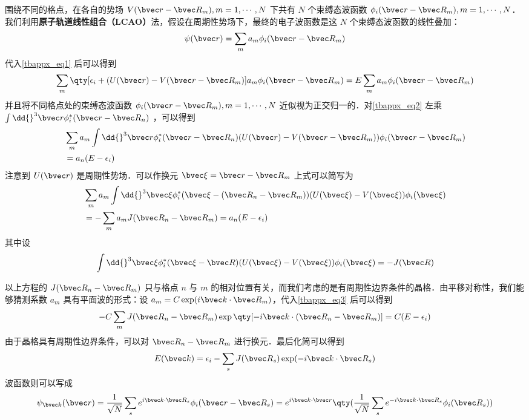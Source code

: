 围绕不同的格点，在各自的势场 $V(\bvec r-\bvec R_m),m=1,\cdots,N$ 下共有 $N$ 个束缚态波函数 $\phi_i(\bvec r-\bvec R_m),m=1,\cdots,N$．我们利用\textbf{原子轨道线性组合（LCAO）}法，假设在周期性势场下，最终的电子波函数是这 $N$ 个束缚态波函数的线性叠加：
\begin{equation}
\psi(\bvec r)=\sum_{m} a_m \phi_i(\bvec r-\bvec R_m)
\end{equation}
代入\autoref{tbappx_eq1} 后可以得到
\begin{equation}\label{tbappx_eq2}
\sum_{m}\qty[\epsilon_i+(U(\bvec r)-V(\bvec r-\bvec R_m)]a_m\phi_i(\bvec r-\bvec R_m)=E\sum_{m} a_m\phi_i(\bvec r-\bvec R_m)
\end{equation}
并且将不同格点处的束缚态波函数 $\phi_i(\bvec r-\bvec R_m),m=1,\cdots,N$ 近似视为正交归一的．对\autoref{tbappx_eq2} 左乘 $\int \dd{}^3 \bvec r\phi_i^*(\bvec r-\bvec R_n)$ ，可以得到
\begin{equation}
\begin{aligned}
&\sum_m a_m \int \dd{}^3 \bvec r \phi_i^*(\bvec r-\bvec R_n)(U(\bvec r)-V(\bvec r-\bvec R_m))\phi_i(\bvec r-\bvec R_m)\\
&=a_n(E-\epsilon_i)
\end{aligned}
\end{equation}
注意到 $U(\bvec r)$ 是周期性势场．可以作换元  $\bvec \xi=\bvec r-\bvec R_m$ 上式可以简写为
\begin{equation}\label{tbappx_eq3}
\begin{aligned}
&\sum_m a_m \int \dd{}^3 \bvec \xi \phi_i^*(\bvec \xi-(\bvec R_n-\bvec R_m))(U(\bvec \xi)-V(\bvec \xi))\phi_i(\bvec \xi)
\\
&=-\sum_m a_m J(\bvec R_n-\bvec R_m)=a_n(E-\epsilon_i)
\end{aligned}
\end{equation}
其中设
\begin{equation}
\int \dd{}^3 \bvec \xi \phi_i^*(\bvec \xi-\bvec R)(U(\bvec \xi)-V(\bvec \xi))\phi_i(\bvec \xi)=-J(\bvec R)
\end{equation}

以上方程的 $J(\bvec R_n-\bvec R_m)$ 只与格点 $n$ 与 $m$ 的相对位置有关，而我们考虑的是有周期性边界条件的晶格．由平移对称性，我们能够猜测系数 $a_m$ 具有平面波的形式：设 $a_m=C\exp(i \bvec k\cdot \bvec R_m)$，代入\autoref{tbappx_eq3} 后可以得到
\begin{equation}
-C\sum_m J(\bvec R_n-\bvec R_m)\exp\qty[-i\bvec k\cdot (\bvec R_n-\bvec R_m)]=C(E-\epsilon_i)
\end{equation}
由于晶格具有周期性边界条件，可以对 $\bvec R_n-\bvec R_m$ 进行换元．最后化简可以得到
\begin{equation}
E(\bvec k)=\epsilon_i-\sum_s J(\bvec R_s)\exp(-i\bvec k\cdot \bvec R_s)
\end{equation}
波函数则可以写成
\begin{equation}
\psi_{\bvec k}(\bvec r)=\frac{1}{\sqrt{N}}\sum_s e^{i\bvec k\cdot \bvec R_s}\phi_i(\bvec r-\bvec R_s)=e^{i\bvec k\cdot \bvec r}\qty(\frac{1}{\sqrt{N}}\sum_s e^{-i\bvec k\cdot \bvec R_s}\phi_i(\bvec R_s))
\end{equation}


